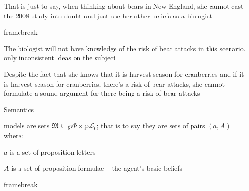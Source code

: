   That is just to say, when thinking about bears in New England, 
   she cannot cast the 2008 study into doubt and just use her other 
   beliefs as a biologist

framebreak
\begin{itemizedot}
  \item The biologist will not have knowledge of the risk of bear attacks in
  this scenario, only inconsistent ideas on the subject
  
  \item Despite the fact that she knows that it is harvest season for
  cranberries and if it is harvest season for cranberries, there's a risk of
  bear attacks, she cannot formulate a sound argument for there being a risk
  of bear attacks
\end{itemizedot}
 Semantics
\begin{itemizedot}
  \item {} models are sets $\mathfrak{M} \subseteq \wp \Phi
  \times \wp \mathcal{L}_0$; that is to say they are sets of pairs $(a, A)$
  where:
  \begin{itemizedot}
    \item $a$ is a set of proposition letters
    
    \item $A$ is a set of proposition formulae -- the agent's basic beliefs
  \end{itemizedot}
\end{itemizedot}
framebreak
